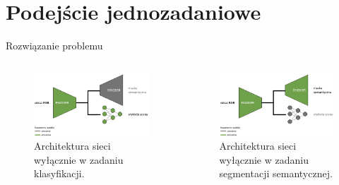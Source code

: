 \documentclass[10pt]{beamer}
\begin{document}
\section*{Podejście jednozadaniowe}
\begin{frame}{Rozwiązanie problemu}
    \begin{columns}
        \begin{column}{0.5\textwidth}
            \begin{figure}
                \includegraphics[width=\textwidth]{images/arch:scene.png}
                \caption{Architektura sieci wyłącznie w zadaniu klasyfikacji.}
            \end{figure}
            
        \end{column}
        
        \begin{column}{0.5\textwidth}
            \begin{figure}
                \includegraphics[width=\textwidth]{images/arch:seg.png}
                \caption{Architektura sieci wyłącznie w zadaniu segmentacji semantycznej.}
            \end{figure}
            
        \end{column}
    \end{columns}

\end{frame}
\end{document}
